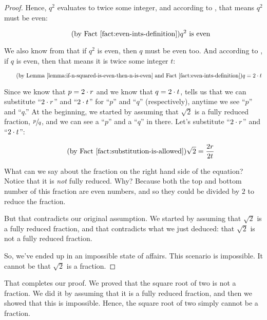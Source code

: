 \documentclass[../../../main.tex]{subfiles}
\begin{document}
\begin{proof}
Hence, $q^{2}$ evaluates to twice some integer, and according to , that means $q^{2}$ must be even:

\begin{equation*}
  \tag{by \factref{fact:even-ints-definition}}
  q^{2} \text{ is even}
\end{equation*}

We also know from  that if $q^{2}$ is even, then $q$ must be even too. And according to , if $q$ is even, then that means it is twice some integer $t$:

\begin{equation*}
  \tag{by \lemmaref{lemma:if-n-squared-is-even-then-n-is-even} and \factref{fact:even-ints-definition}}
  q = 2 \mult/ t
\end{equation*}

Since we know that $p = 2 \mult/ r$ and we know that $q = 2 \mult/ t$,  tells us that we can substitute ``$2 \mult/ r$'' and ``$2 \mult/ t$'' for ``$p$'' and ``$q$'' (respectively), anytime we see ``$p$'' and ``$q$.'' At the beginning, we started by assuming that $\sqrt{2}$ is a fully reduced fraction, $\sfrac{p}{q}$, and we can see a ``$p$'' and a ``$q$'' in there. Let's substitute ``$2 \mult/ r$'' and ``$2 \mult/ t$'':

\begin{equation*}
  \tag{by \factref{fact:substitution-is-allowed}}
  \sqrt{2} = \frac{2r}{2t}
\end{equation*}

What can we say about the fraction on the right hand side of the equation? Notice that it is \emph{not} fully reduced. Why? Because both the top and bottom number of this fraction are even numbers, and so they could be divided by $2$ to reduce the fraction. 

But that contradicts our original assumption. We started by assuming that $\sqrt{2}$ is a fully reduced fraction, and that contradicts what we just deduced: that $\sqrt{2}$ is not a fully reduced fraction.

So, we've ended up in an impossible state of affairs. This scenario is impossible. It cannot be that $\sqrt{2}$ is a fraction.

\end{proof}

That completes our proof. We proved that the square root of two is not a fraction. We did it by assuming that it is a fully reduced fraction, and then we showed that this is impossible. Hence, the square root of two simply cannot be a fraction.
\end{document}
